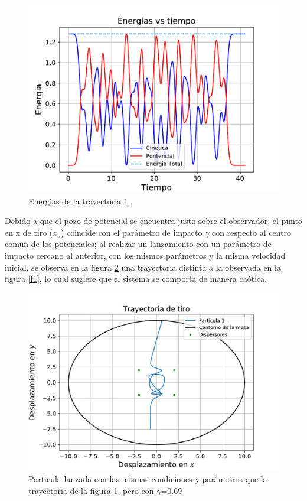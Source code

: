 \documentclass[11pt,letterpaper,twocolumn]{article}
\begin{document}
\begin{figure}[H]
\centering 
\includegraphics[scale=0.55]{g3.pdf}
\caption{Energias de la trayectoria 1.}
\label{ene}
\end{figure}   
\par 
Debido a que el pozo de potencial se encuentra justo sobre el observador, el punto en x de tiro ($x_{o}$) coincide con el parámetro de impacto $\gamma$ con respecto al centro común de los potenciales; al realizar un lanzamiento con un parámetro de impacto cercano al anterior, con los mismos parámetros y la misma velocidad inicial, se observa en la figura \ref{f3} una trayectoria distinta a la observada en la figura \ref{f1}, lo cual sugiere que el sistema se comporta de manera caótica.
\begin{figure}[H]
\centering 
\includegraphics[scale=0.5]{g4.pdf}
\caption{Particula lanzada con las mismas condiciones y parámetros que la trayectoria de la figura 1, pero con $\gamma$=0.69}
\label{f3}
\end{figure}   
\end{document}
